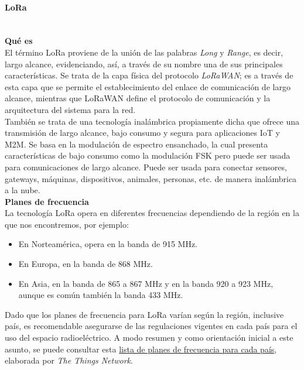 \documentclass[12pt]{article}
\newcommand{\subsubsubsection}[1]{\paragraph{#1}\mbox{}\\}
\begin{document}
	
	\subsubsubsection{LoRa}
	
	\noindent \textbf{Qué es}\\
	
	\noindent El término LoRa proviene de la unión de las palabras \textit{Long} y \textit{Range}, es decir, largo alcance, evidenciando, así, a través de su nombre una de sus principales características. Se trata de la capa física del protocolo \textit{LoRaWAN}; es a través de esta capa que se permite el establecimiento del enlace de comunicación de largo alcance, mientras que LoRaWAN define el protocolo de comunicación y la arquitectura del sistema para la red. \\
	
	\noindent También se trata de una tecnología inalámbrica propiamente dicha que ofrece una transmisión de largo alcance, bajo consumo y segura para aplicaciones IoT y M2M. Se basa en la modulación de espectro ensanchado, la cual presenta características de bajo consumo como la modulación FSK pero puede ser usada para comunicaciones de largo alcance. Puede ser usada para conectar sensores, gateways, máquinas, dispositivos, animales, personas, etc. de manera inalámbrica a la nube.\\
	
	\noindent \textbf{Planes de frecuencia} \\
	
	\noindent La tecnología LoRa opera en diferentes frecuencias dependiendo de la región en la que nos encontremos, por ejemplo: \\
	
	\begin{itemize}
		\item En Norteamérica, opera en la banda de 915 MHz.
		\item En Europa, en la banda de 868 MHz.
		\item En Asia, en la banda de 865 a 867 MHz y en la banda 920 a 923 MHz, aunque es común también la banda 433 MHz.
	\end{itemize}
	
	\noindent Dado que los planes de frecuencia para LoRa varían según la región, inclusive país, es recomendable asegurarse de las regulaciones vigentes en cada país para el uso del espacio radioeléctrico. A modo resumen y como orientación inicial a este asunto, se puede consultar esta \href{https://www.thethingsnetwork.org/docs/lorawan/frequencies-by-country/index.html}{lista de planes de frecuencia para cada país}, elaborada por \textit{The Things Network}. \\
	
\end{document}
